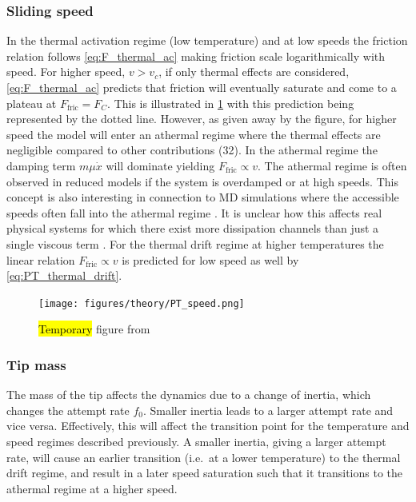 


\subsubsection{Sliding speed}
In the thermal activation regime (low temperature) and at low speeds the friction relation follows \cref{eq:F_thermal_ac} making friction scale logarithmically with speed. For higher speed, $v > v_c$, if only thermal effects are considered, \cref{eq:F_thermal_ac} predicts that friction will eventually saturate and come to a plateau at $F_{\text{fric}} = F_C$. This is illustrated in \cref{fig:PT_speed} with this prediction being represented by the dotted line. However, as given away by the figure, for higher speed the model will enter an athermal regime where the thermal effects are negligible compared to other contributions \cite{Yalin_2011}(32). In the athermal regime the damping term $m\mu \dot{x}$ will dominate yielding $F_{\text{fric}}
\propto v$. The athermal regime is often observed in reduced models if the system is overdamped or at high speeds. This concept is also interesting in connection to \acrshort{MD} simulations where the accessible speeds often fall into the athermal regime \cite{Li_2011}. It is unclear how this affects real physical systems for which there exist more dissipation channels than just a single viscous term \cite{Dong_2013}. For the thermal drift regime at higher temperatures the linear relation $F_{\text{fric}} \propto v$ is predicted for low speed as well by \cref{eq:PT_thermal_drift}.

\begin{figure}[H]
  \centering
  \texttt{[image: figures/theory/PT\_speed.png]}
  \caption{\hl{Temporary} figure from \cite{Yalin_2011}}
  \label{fig:PT_speed}
\end{figure}


\subsubsection{Tip mass}
The mass of the tip affects the dynamics due to a change of inertia, which changes the attempt rate $f_0$. Smaller inertia leads to a larger attempt rate and vice versa. Effectively, this will affect the transition point for the temperature and speed regimes described previously. A smaller inertia, giving a larger attempt rate, will cause an earlier transition (i.e.\ at a lower temperature) to the thermal drift regime, and result in a later speed saturation such that it transitions to the athermal regime at a higher speed. 


